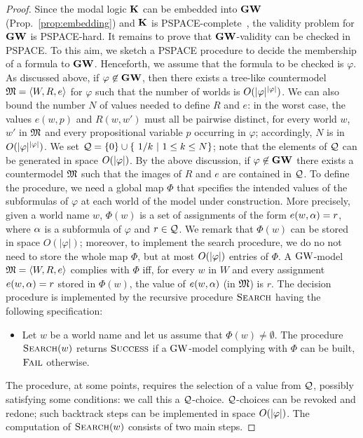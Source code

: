 \begin{proof}
  Since the modal logic $\mathbf{K}$ can be embedded into $\mathbf{GW}$
  (Prop.~\ref{prop:embedding}) and $\mathbf{K}$ is
  PSPACE-complete~\cite{Ladner:77}, the validity problem for $\mathbf{GW}$ is
  PSPACE-hard.  It remains to prove that $\mathbf{GW}$-validity can be
  checked in PSPACE.  To this aim, we sketch a PSPACE procedure to
  decide the membership of a formula to $\mathbf{GW}$.  Henceforth, we assume
  that the formula to be checked is $\varphi$.  As discussed above, if
  $\varphi\not\in\mathbf{GW}$, then there exists a tree-like countermodel
  $\mathfrak{M}=\langle W,R,e \rangle$ for $\varphi$ such that the number of worlds is
  $O(|\varphi|^{|\varphi|})$.  We can also bound the number
  $N$ of values needed to define $R$ and $e$: in the worst case, the
  values $e(w,p)$ and $R(w,w')$ must all be pairwise distinct, for
  every world $w$, $w'$ in $\mathfrak{M}$ and every propositional variable $p$
  occurring in $\varphi$; accordingly, $N$ is in
  $O(|\varphi|^{|\varphi|})$.  We set
  $\mathcal{Q}=\{0\}\cup\{~1/k~|~1\leq k\leq N\}$; note that the elements of
  $\mathcal{Q}$ can be generated in space $O(|\varphi|)$.  By the above
  discussion, if $\varphi\not\in\mathbf{GW}$ there exists a countermodel $\mathfrak{M}$
  such that the images of $R$ and $e$ are contained in $\mathcal{Q}$.  To
  define the procedure, we need a global map $\Phi$ that specifies the
  intended values of the subformulas of $\varphi$ at each world of the
  model under construction.  More precisely, given a world name $w$,
  $\Phi(w)$ is a set of assignments of the form $e(w,\alpha)=r$, where
  $\alpha$ is a subformula of $\varphi$ and $r\in\mathcal{Q}$. We remark that
  $\Phi(w)$ can be stored in space $O(|\varphi|)$; moreover, to
  implement the search procedure, we do no not need to store the whole
  map $\Phi$, but at most $O(|\varphi|)$ entries of $\Phi$.  A
  $\mbox{$\mathrm{GW}$}$-model $\mathfrak{M}=\langle W,R,e \rangle$ complies with $\Phi$ iff, for every
  $w$ in $W$ and every assignment $e(w,\alpha)=r$ stored in $\Phi(w)$, the
  value of $e(w,\alpha)$ (in $\mathfrak{M}$) is $r$.  The decision procedure is
  implemented by the recursive procedure $\textsc{Search}$ having the
  following specification:

\begin{itemize}
\item Let $w$ be a world name and let us assume that $\Phi(w)\neq
  \emptyset$.  The procedure $\textsc{Search}(w)$ returns $\textsc{Success}$ if a
  $\mbox{$\mathrm{GW}$}$-model complying with $\Phi$ can be built, $\textsc{Fail}$ otherwise.
\end{itemize}

\noindent
The procedure, at some points, requires the selection of a value from
$\mathcal{Q}$, possibly satisfying some conditions: we call this a
$\mathcal{Q}$-choice.  $\mathcal{Q}$-choices can be revoked and redone; such
backtrack steps can be implemented in space $O(|\varphi|)$.  The
computation of $\textsc{Search}(w)$ consists of two main steps.


\end{proof}
